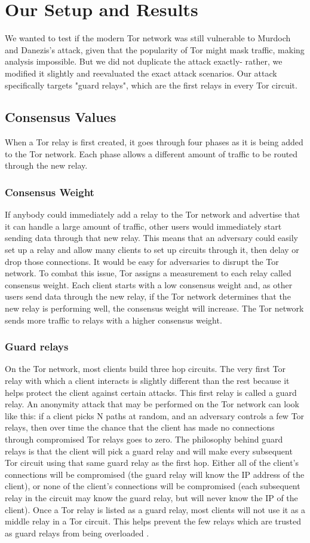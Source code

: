 \documentclass[12pt,journal]{IEEEtran}
\begin{document}
\section{Our Setup and Results}
We wanted to test if the modern Tor network was still vulnerable to Murdoch and Danezis's attack, given that the popularity of Tor might mask traffic, making analysis impossible. But we did not duplicate the attack exactly- rather, we modified it slightly and reevaluated the exact attack scenarios. Our attack specifically targets "guard relays", which are the first relays in every Tor circuit.
\subsection{Consensus Values}
When a Tor relay is first created, it goes through four phases as it is being added to the Tor network. Each phase allows a different amount of traffic to be routed through the new relay.
\subsubsection{Consensus Weight}
If anybody could immediately add a relay to the Tor network and advertise that it can handle a large amount of traffic, other users would immediately start sending data through that new relay. This means that an adversary could easily set up a relay and allow many clients to set up circuits through it, then delay or drop those connections. It would be easy for adversaries to disrupt the Tor network. To combat this issue, Tor assigns a measurement to each relay called consensus weight. Each client starts with a low consensus weight and, as other users send data through the new relay, if the Tor network determines that the new relay is performing well, the consensus weight will increase. The Tor network sends more traffic to relays with a higher consensus weight.
\subsubsection{Guard relays}
On the Tor network, most clients build three hop circuits. The very first Tor relay with which a client interacts is slightly different than the rest because it helps protect the client against certain attacks. This first relay is called a guard relay. An anonymity attack that may be performed on the Tor network can look like this: if a client picks N paths at random, and an adversary controls a few Tor relays, then over time the chance that the client has made no connections through compromised Tor relays goes to zero. The philosophy behind guard relays is that the client will pick a guard relay and will make every subsequent Tor circuit using that same guard relay as the first hop. Either all of the client's connections will be compromised (the guard relay will know the IP address of the client), or none of the client's connections will be compromised (each subsequent relay in the circuit may know the guard relay, but will never know the IP of the client). Once a Tor relay is listed as a guard relay, most clients will not use it as a middle relay in a Tor circuit. This helps prevent the few relays which are trusted as guard relays from being overloaded \cite{arma2013}.
\end{document}
